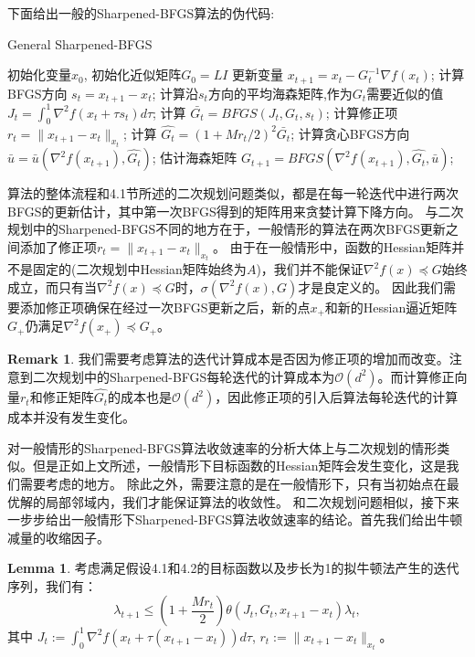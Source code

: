 \documentclass[a4paper,twoside,AutoFakeBold]{article}
\theoremstyle{definition}
\newtheorem{lema2}{{Lemma}}
\newtheorem{remark2}{{Remark}}
\begin{document}
下面给出一般的Sharpened-BFGS算法的伪代码:
\begin{algorithm}[H]\xiaosi
    \caption{\xiaosi General Sharpened-BFGS}
    \begin{algorithmic}{
        \REQUIRE 初始化变量$x_0$, 初始化近似矩阵$G_0=LI$
            \STATE 更新变量 $x_{t+1}=x_t-G_t^{-1}\nabla f(x_t)$;
            \STATE 计算BFGS方向 $s_t=x_{t+1}-x_t$;
            \STATE 计算沿$s_t$方向的平均海森矩阵,作为$G_t$需要近似的值 $J_t=\int_0^1\nabla^2f(x_t+\tau s_t)d\tau$;
            \STATE 计算 $\bar{G_t}=BFGS(J_t,G_t,s_t)$;
            \STATE 计算修正项 $r_t = \|x_{t + 1} - x_{t}\|_{x_t}$;
            \STATE 计算 $\hat{G_t} = (1 + {Mr_t}/{2})^2\bar{G_t}$;
            \STATE 计算贪心BFGS方向$\bar{u} = \bar{u}(\nabla^2{f(x_{t + 1})}, \hat{G_t})$;
            \STATE 估计海森矩阵 $G_{t + 1} = BFGS(\nabla^2{f(x_{t + 1})}, \hat{G_t}, \bar{u})$;
        \ENDFOR}
    \end{algorithmic}
\end{algorithm}
算法的整体流程和4.1节所述的二次规划问题类似，都是在每一轮迭代中进行两次BFGS的更新估计，其中第一次BFGS得到的矩阵用来贪婪计算下降方向。
与二次规划中的Sharpened-BFGS不同的地方在于，一般情形的算法在两次BFGS更新之间添加了修正项$r_t=\|x_{t + 1} - x_{t}\|_{x_t}$。
由于在一般情形中，函数的Hessian矩阵并不是固定的(二次规划中Hessian矩阵始终为$A$)，我们并不能保证$\nabla^2 f(x)\preceq G$始终成立，而只有当$\nabla^2 f(x)\preceq G$时，$\sigma (\nabla^2 f(x),G)$才是良定义的。
因此我们需要添加修正项确保在经过一次BFGS更新之后，新的点$x_{+}$和新的Hessian逼近矩阵$G_{+}$仍满足$\nabla^2 f(x_{+})\preceq G_{+}$。
\begin{remark2}
    我们需要考虑算法的迭代计算成本是否因为修正项的增加而改变。注意到二次规划中的Sharpened-BFGS每轮迭代的计算成本为$\mathcal{O}(d^2)$。而计算修正向量$r_t$和修正矩阵$\hat{G_t}$的成本也是$\mathcal{O}(d^2)$，因此修正项的引入后算法每轮迭代的计算成本并没有发生变化。
\end{remark2}

对一般情形的Sharpened-BFGS算法收敛速率的分析大体上与二次规划的情形类似。但是正如上文所述，一般情形下目标函数的Hessian矩阵会发生变化，这是我们需要考虑的地方。
除此之外，需要注意的是在一般情形下，只有当初始点在最优解的局部邻域内，我们才能保证算法的收敛性。
和二次规划问题相似，接下来一步步给出一般情形下Sharpened-BFGS算法收敛速率的结论。首先我们给出牛顿减量的收缩因子。

\begin{lema2}
    考虑满足假设4.1和4.2的目标函数以及步长为1的拟牛顿法产生的迭代序列，我们有：
    \begin{equation}
        \lambda_{t+1} \leq \left(1 + \frac{Mr_t}{2}\right)\theta(J_t, G_t, x_{t + 1} - x_{t})\lambda_t,
    \end{equation}
    其中 $J_t := \int_{0}^{1}\nabla^2{f(x_t + \tau(x_{t + 1} - x_{t}))d\tau}$, $r_t := \|x_{t+1} - x_t\|_{x_t}$。
\end{lema2}
\end{document}
